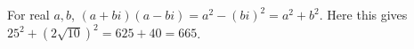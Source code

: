 For real $a,b$, $(a+bi)(a-bi)=a^2-(bi)^2=a^2+b^2$. Here this gives $25^2+\left(2\sqrt{10}\right)^2=625+40=\boxed{665}$.
